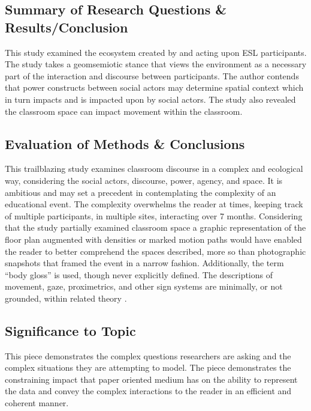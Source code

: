 \documentclass[leavefloats]{apa6e}\usepackage[]{graphicx}\usepackage[]{color}
\begin{document}



\regpar



\subsection{Summary of Research Questions \& Results/Conclusion} %
This study examined the ecosystem created by and acting upon ESL participants.  The study takes a geomsemiotic stance that views the environment as a necessary part of the interaction and discourse between participants.  The author contends that power constructs between social actors may determine spatial context which in turn impacts and is impacted upon by social actors.  The study also revealed the classroom space can impact movement within the classroom.  

\subsection{Evaluation of Methods \& Conclusions} %
This trailblazing study examines classroom discourse in a complex and ecological way, considering the social actors, discourse, power, agency, and space.  It is ambitious and may set a precedent in contemplating the complexity of an educational event.  The complexity overwhelms the reader at times, keeping track of multiple participants, in multiple sites, interacting over 7 months.  Considering that the study partially examined classroom space a graphic representation of the floor plan augmented with densities or marked motion paths would have enabled the reader to better comprehend the spaces described, more so than photographic snapshots that framed the event in a narrow fashion.  Additionally, the term ``body gloss'' is used, though never explicitly defined.  The descriptions of movement, gaze, proximetrics, and other sign systems are minimally, or not grounded, within related theory \parencite[e.g.,][]{McNeil1996, McNeil2005, Norris2004, Norris2009}.

\subsection{Significance to Topic} %
This piece demonstrates the complex questions researchers are asking and the complex situations they are attempting to model.  The piece demonstrates the constraining impact that paper oriented medium has on the ability to represent the data and convey the complex interactions to the reader in an efficient and coherent manner.
\end{document}
